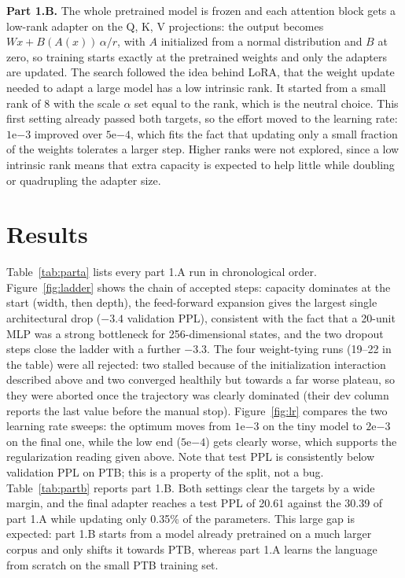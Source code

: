 \documentclass[a4paper]{article}
\begin{document}
\textbf{Part 1.B.} The whole pretrained model is frozen and each attention block gets a low-rank adapter on the Q, K, V projections: the output becomes $Wx + B(A(x))\,\alpha/r$, with $A$ initialized from a normal distribution and $B$ at zero, so training starts exactly at the pretrained weights and only the adapters are updated. The search followed the idea behind LoRA, that the weight update needed to adapt a large model has a low intrinsic rank. It started from a small rank of 8 with the scale $\alpha$ set equal to the rank, which is the neutral choice. This first setting already passed both targets, so the effort moved to the learning rate: $1\mathrm{e}{-3}$ improved over $5\mathrm{e}{-4}$, which fits the fact that updating only a small fraction of the weights tolerates a larger step. Higher ranks were not explored, since a low intrinsic rank means that extra capacity is expected to help little while doubling or quadrupling the adapter size.

\section{Results}
Table~\ref{tab:parta} lists every part 1.A run in chronological order. Figure~\ref{fig:ladder} shows the chain of accepted steps: capacity dominates at the start (width, then depth), the feed-forward expansion gives the largest single architectural drop ($-3.4$ validation PPL), consistent with the fact that a 20-unit MLP was a strong bottleneck for 256-dimensional states, and the two dropout steps close the ladder with a further $-3.3$. The four weight-tying runs (19--22 in the table) were all rejected: two stalled because of the initialization interaction described above and two converged healthily but towards a far worse plateau, so they were aborted once the trajectory was clearly dominated (their dev column reports the last value before the manual stop). Figure~\ref{fig:lr} compares the two learning rate sweeps: the optimum moves from $1\mathrm{e}{-3}$ on the tiny model to $2\mathrm{e}{-3}$ on the final one, while the low end ($5\mathrm{e}{-4}$) gets clearly worse, which supports the regularization reading given above. Note that test PPL is consistently below validation PPL on PTB; this is a property of the split, not a bug. Table~\ref{tab:partb} reports part 1.B. Both settings clear the targets by a wide margin, and the final adapter reaches a test PPL of 20.61 against the 30.39 of part 1.A while updating only 0.35\% of the parameters. This large gap is expected: part 1.B starts from a model already pretrained on a much larger corpus and only shifts it towards PTB, whereas part 1.A learns the language from scratch on the small PTB training set.
\end{document}

